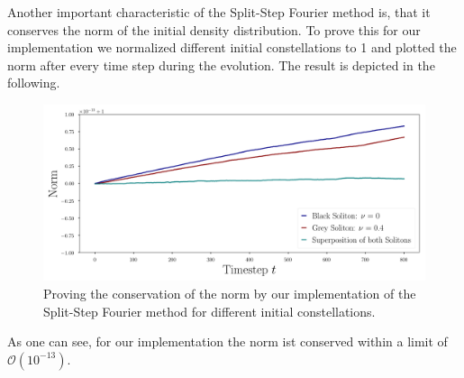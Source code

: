 Another important characteristic of the Split-Step Fourier method is, that it conserves the norm of the initial density distribution. To prove this for our implementation we normalized different initial constellations to 1 and plotted the norm after every time step during the evolution. The result is depicted in the following.
\begin{figure}[H]
	\centering
	\includegraphics[scale = 0.25]{figures/norm}
	\caption{Proving the conservation of the norm by our implementation of the Split-Step Fourier method for different initial constellations.}
\end{figure}
As one can see, for our implementation the norm ist conserved within a limit of $\mathcal{O}(10^{-13})$.